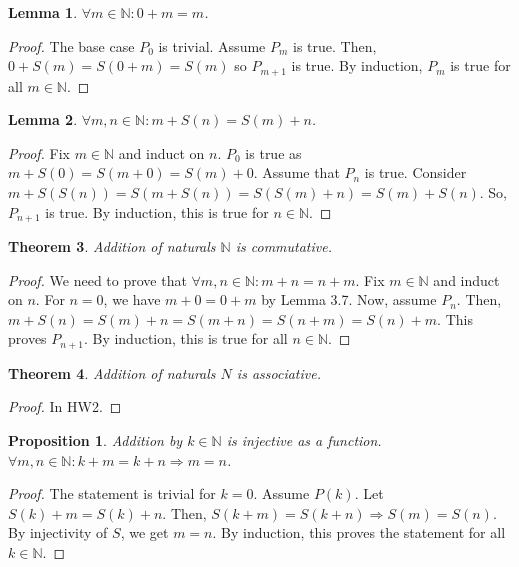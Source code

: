 \documentclass{article}
\newcommand\N{\ensuremath{\mathbb{N}}}
\newtheorem{theorem}{Theorem}[section]
\newtheorem{lemma}[theorem]{Lemma}
\theoremstyle{definition}
\theoremstyle{remark}
\theoremstyle{plain}
\newtheorem{prop}{Proposition}[subsection]
\begin{document}
\begin{lemma}
    \(\forall m \in \N: 0 + m = m\).
\end{lemma}
\begin{proof}
    The base case \(P_0\) is trivial. Assume \(P_m\) is true. Then, \(0 + S(m) = S(0 + m) = S(m)\) so \(P_{m+1}\) is true.
    By induction, \(P_m\) is true for all \(m \in \N\).
\end{proof}

\begin{lemma}
    \(\forall m,n \in \N: m + S(n) = S(m) + n\).
\end{lemma}
\begin{proof}
    Fix \(m \in \N\) and induct on \(n\). \(P_0\) is true as 
    \(m + S(0) = S(m + 0) = S(m) + 0\). Assume that \(P_n\) is true. 
    Consider \(m + S(S(n)) = S(m + S(n)) = S(S(m) + n) = S(m) + S(n)\). So,
    \(P_{n+1}\) is true. By induction, this is true for \(n \in \N\).
\end{proof}

\begin{theorem}
    Addition of naturals \(\N\) is commutative.
\end{theorem}
\begin{proof}
    We need to prove that \(\forall m,n \in \N: m + n = n + m\). Fix \(m \in \N\) and induct on \(n\).
    For \(n = 0\), we have \(m + 0 = 0 + m\) by Lemma 3.7. Now, assume \(P_n\). Then, \(m + S(n) = S(m) + n = S(m+n) = S(n+m) = S(n) + m\). 
    This proves \(P_{n+1}\). By induction, this is true for all \(n \in \N\).
    
\end{proof}

\begin{theorem}
    Addition of naturals \(N\) is associative. 
\end{theorem}
\begin{proof}
    In HW2.
\end{proof}

\begin{prop}
    Addition by \(k \in \N\) is injective as a function. \(\forall m,n \in \N: k + m = k + n \Rightarrow m = n\).
\end{prop}

\begin{proof}
    The statement is trivial for \(k = 0\). Assume \(P(k)\). Let \(S(k) + m = S(k) + n\). 
    Then, \(S(k + m) = S(k+n) \Rightarrow S(m) = S(n)\). By injectivity of \(S\), we get \(m = n\). By
    induction, this proves the statement for all \(k \in \N\).
\end{proof}
\end{document}
